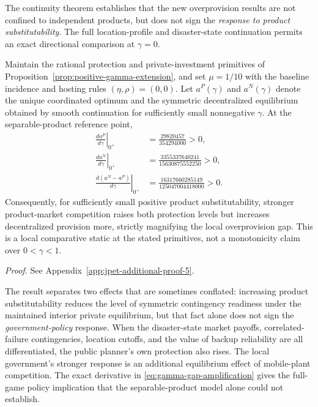 The continuity theorem establishes that the new overprovision results are
not confined to independent products, but does not sign the
\emph{response to product substitutability}. The full
location-profile and disaster-state continuation permits an
exact directional comparison at $\gamma=0$.

\begin{proposition}
\label{prop:gamma-gap-amplification}
Maintain the rational protection and private-investment primitives
of Proposition~\ref{prop:positive-gamma-extension}, and set
$\mu=1/10$ with the baseline incidence and hosting rules
$(\eta,\rho)=(0,0)$. Let $a^P(\gamma)$ and
$a^N(\gamma)$ denote the unique coordinated optimum and the
symmetric decentralized equilibrium obtained by smooth continuation
for sufficiently small nonnegative $\gamma$.
At the separable-product reference point,
\begin{align}
\left.\frac{d a^P}{d\gamma}\right|_{0^+}
&=\frac{29820457}{354294000}>0,\\
\left.\frac{d a^N}{d\gamma}\right|_{0^+}
&=\frac{3355337640241}{15630875552250}>0,\\
\left.\frac{d(a^N-a^P)}{d\gamma}\right|_{0^+}
&=\frac{16317660285149}{125047004418000}>0.
\label{eq:gamma-gap-amplification}
\end{align}
Consequently, for sufficiently small positive product
substitutability, stronger product-market competition raises
both protection levels but increases decentralized provision
more, strictly magnifying the local overprovision gap.
This is a local comparative static at the stated primitives,
not a monotonicity claim over $0<\gamma<1$.
\end{proposition}

\noindent\emph{Proof.} See Appendix~\ref{app:jpet-additional-proof-5}.

The result separates two effects that are sometimes conflated:
increasing product substitutability reduces the level of
symmetric contingency readiness under the maintained interior
private equilibrium, but that fact alone does not sign the
\emph{government-policy} response. When the disaster-state
market payoffs, correlated-failure contingencies, location cutoffs,
and the value of backup reliability are all differentiated,
the public planner's own protection also rises. The local
government's stronger response is an additional equilibrium
effect of mobile-plant competition. The exact derivative
in \eqref{eq:gamma-gap-amplification} gives the full-game
policy implication that the separable-product model alone
could not establish.
